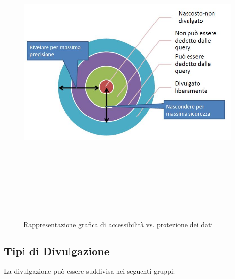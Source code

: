 \begin{figure}[htbp]

	\centering

	{\includegraphics[height=15cm, width=12cm, keepaspectratio]{Immagini/Appendice1/prot_dati_03.JPG}}
				\caption{Rappresentazione grafica di accessibilità vs. protezione dei dati \label{fig:protezione_vs_accessibilita}}

\end{figure}

\subsection{Tipi di Divulgazione}
La divulgazione può essere suddivisa nei seguenti gruppi:

